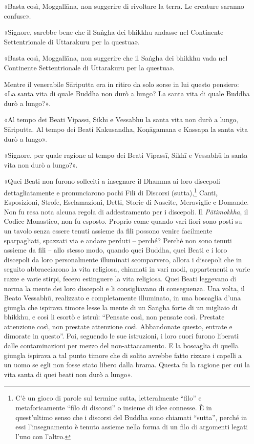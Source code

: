 «Basta così, Moggallāna, non suggerire di rivoltare la terra. Le creature
saranno confuse».

«Signore, sarebbe bene che il Saṅgha dei bhikkhu andasse nel Continente
Settentrionale di Uttarakuru per la questua».

«Basta così, Moggallāna, non suggerire che il Saṅgha dei bhikkhu vada nel
Continente Settentrionale di Uttarakuru per la questua».

Mentre il venerabile Sāriputta era in ritiro da solo sorse in lui questo
pensiero: «La santa vita di quale Buddha non durò a lungo? La santa vita di
quale Buddha durò a lungo?».

«Al tempo dei Beati Vipassī, Sikhī e Vessabhū la santa vita non durò a lungo,
Sāriputta. Al tempo dei Beati Kakusandha, Koṇāgamana e Kassapa la santa vita
durò a lungo».

«Signore, per quale ragione al tempo dei Beati Vipassī, Sikhī e Vessabhū la
santa vita non durò a lungo?».

«Quei Beati non furono solleciti a insegnare il Dhamma ai loro discepoli
dettagliatamente e pronunciarono pochi Fili di Discorsi (sutta),\footnote{C’è un
  gioco di parole sul termine sutta, letteralmente “filo” e metaforicamente
  “filo di discorsi” o insieme di idee connesse. È in quest’ultimo senso che i
  discorsi del Buddha sono chiamati “sutta”, perché in essi l’insegnamento è
  tenuto assieme nella forma di un filo di argomenti legati l’uno con l’altro.}
Canti, Esposizioni, Strofe, Esclamazioni, Detti, Storie di Nascite, Meraviglie e
Domande. Non fu resa nota alcuna regola di addestramento per i discepoli. Il
\emph{Pātimokkha}, il Codice Monastico, non fu esposto. Proprio come quando vari
fiori sono posti su un tavolo senza essere tenuti assieme da fili possono venire
facilmente sparpagliati, spazzati via e andare perduti – perché? Perché non sono
tenuti assieme da fili – allo stesso modo, quando quei Buddha, quei Beati e i
loro discepoli da loro personalmente illuminati scomparvero, allora i discepoli
che in seguito abbracciarono la vita religiosa, chiamati in vari modi,
appartenenti a varie razze e varie stirpi, fecero estinguere la vita religiosa.
Quei Beati leggevano di norma la mente dei loro discepoli e li consigliavano di
conseguenza. Una volta, il Beato Vessabhū, realizzato e completamente
illuminato, in una boscaglia d’una giungla che ispirava timore lesse la mente di
un Saṅgha forte di un migliaio di bhikkhu, e così li esortò e istruì: “Pensate
così, non pensate così. Prestate attenzione così, non prestate attenzione così.
Abbandonate questo, entrate e dimorate in questo”. Poi, seguendo le sue
istruzioni, i loro cuori furono liberati dalle contaminazioni per mezzo del
non-attaccamento. E la boscaglia di quella giungla ispirava a tal punto timore
che di solito avrebbe fatto rizzare i capelli a un uomo se egli non fosse stato
libero dalla brama. Questa fu la ragione per cui la vita santa di quei beati non
durò a lungo».

